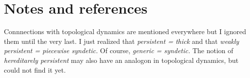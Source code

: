 \documentclass[10pt,openany]{amsproc}
\theoremstyle{mio}
\begin{document}
\section{Notes and references}

Connnections with topological dynamics are mentioned everywhere but I ignored them until the very last.
I just realized that \textit{persistent = thick\/} and that \textit{weakly persistent = piecewise syndetic.} 
Of course, \textit{generic = syndetic.}
The notion of \textit{hereditarely persistent\/} may also have an analogon in topological dynamics, but could not find it yet.

  \begin{biblist}[]\normalsize
  \end{biblist}

  
\end{document}

